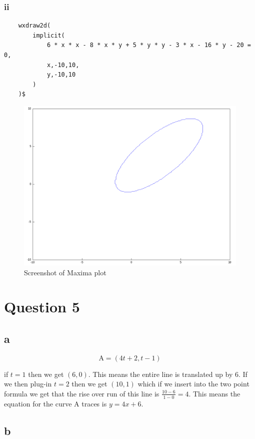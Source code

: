 \documentclass{article}
\begin{document}
\subsubsection{ii}

\begin{lstlisting}
	wxdraw2d(
        implicit(
            6 * x * x - 8 * x * y + 5 * y * y - 3 * x - 16 * y - 20 = 0,
            x,-10,10,
            y,-10,10
        )
	)$
\end{lstlisting}

\begin{figure}
	\centering

	\includegraphics[width=.7\linewidth]{TMA01-T4bii}
	\caption{Screenshot of Maxima plot}


\end{figure}

\section{Question 5}

\subsection{a}

$$\mathrm A = (4 t + 2 , t - 1)$$

if $t=1$ then we get $(6,0)$. This means the entire line is translated up by $6$. If we then plug-in $t=2$ then we get $(10,1)$ which if we insert into the two point formula we get that the rise over run of this line is $\frac {10 - 6}{1 - 0} = 4$. This means the equation for the curve $\mathrm A$ traces is $y = 4x + 6$.

\subsection{b}
\end{document}
